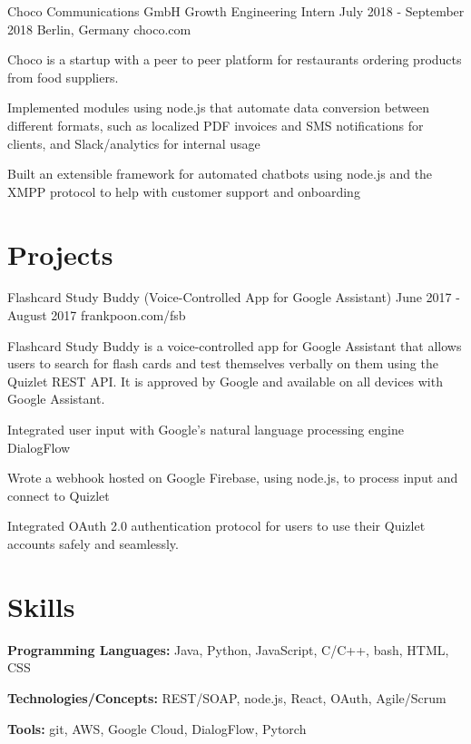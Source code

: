 \documentclass{resume}
\begin{document}
\job
{Choco Communications GmbH}
{Growth Engineering Intern}
{July 2018 - September 2018}
{Berlin, Germany}
{choco.com}
{
  Choco is a startup with a peer to peer platform for restaurants ordering 
  products from food suppliers.
  \begin{overview}
    \item Implemented modules using node.js that automate data conversion between 
          different formats, such as localized PDF invoices and SMS 
          notifications for clients, and Slack/analytics for internal usage
    \item Built an extensible framework for automated chatbots using node.js 
          and the XMPP protocol to help with customer support and onboarding
  \end{overview}
}

\section{Projects}

\project
{Flashcard Study Buddy (Voice-Controlled App for Google Assistant)}
{June 2017 - August 2017}
{frankpoon.com/fsb}
{
  Flashcard Study Buddy is a voice-controlled app for Google Assistant that 
  allows users to search for flash cards and test themselves verbally on them 
  using the Quizlet REST API. It is approved by Google and available on all 
  devices with Google Assistant.
  \begin{overview}
    \item Integrated user input with Google's natural language processing engine 
          DialogFlow
    \item Wrote a webhook hosted on Google Firebase, using node.js, to process 
          input and connect to Quizlet
    \item Integrated OAuth 2.0 authentication protocol for users to use their 
          Quizlet accounts safely and seamlessly.
  \end{overview}
}

\section{Skills}
\textbf{Programming Languages:} Java, Python, JavaScript, C/C++, bash, HTML, CSS

\textbf{Technologies/Concepts:} REST/SOAP, node.js, React, OAuth, Agile/Scrum

\textbf{Tools:} git, AWS, Google Cloud, DialogFlow, Pytorch
\end{document}
